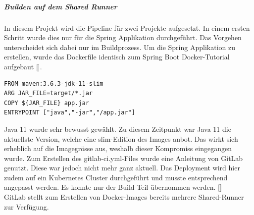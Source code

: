 \subparagraph{Builden auf dem Shared Runner}
In diesem Projekt wird die Pipeline für zwei Projekte aufgesetzt. In einem ersten Schritt wurde dies nur für die Spring Applikation durchgeführt. 
Das Vorgehen unterscheidet sich dabei nur im Buildprozess. 
Um die Spring Applikation zu erstellen, wurde das Dockerfile identisch zum Spring Boot Docker-Tutorial aufgebaut [\cite{springBootDocker}].

\begin{verbatim}
FROM maven:3.6.3-jdk-11-slim
ARG JAR_FILE=target/*.jar
COPY ${JAR_FILE} app.jar
ENTRYPOINT ["java","-jar","/app.jar"]
\end{verbatim}
Java 11 wurde sehr bewusst gewählt. Zu diesem Zeitpunkt war Java 11 die aktuellste Version, welche eine slim-Edition des Images anbot. Das wirkt sich erheblich auf die Imagegrösse aus, weshalb dieser Kompromiss eingegangen wurde. 
Zum Erstellen des gitlab-ci.yml-Files wurde eine Anleitung von \gls{GitLab} genutzt. Diese war jedoch nicht mehr ganz aktuell. Das Deployment wird hier zudem auf ein Kubernetes Cluster durchgeführt und musste entsprechend angepasst werden. Es konnte nur der Build-Teil übernommen werden. [\cite{springBootCI}]\\
\gls{GitLab} stellt zum Erstellen von Docker-Images bereits mehrere Shared-Runner zur Verfügung. 

